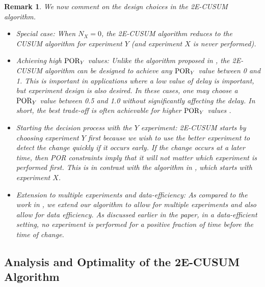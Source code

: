 \documentclass[journal, onecolumn]{IEEEtran}
\newtheorem{remark}{Remark}
\begin{document}
\begin{remark}
We now comment on the design choices in the \textup{2E-CUSUM} algorithm. 

\begin{itemize}
\item \textup{Special case}: When $N_X = 0$, the \textup{2E-CUSUM} algorithm reduces to the \textup{CUSUM} algorithm for experiment $Y$ (and experiment $X$ is never performed).

\item \textup{Achieving high $\textup{POR}_Y$ values}: Unlike the algorithm proposed in \cite{ren2017}, the \textup{2E-CUSUM} algorithm can be designed to achieve any $\textup{POR}_Y$ value between 0 and 1. This is important in applications where a low value of delay is important, but experiment design is also desired. In these cases, one may choose a $\textup{POR}_Y$ value between 0.5 and 1.0 without significantly affecting the delay. In short, the best trade-off is often achievable for higher $\textup{POR}_Y$ values \cite{banerjee2013}.

\item \textup{Starting the decision process with the $Y$ experiment}: \textup{2E-CUSUM} starts by choosing experiment $Y$ first because we wish to use the better experiment to detect the change quickly if it occurs early. If the change occurs at a later time, then POR constraints imply that it will not matter which experiment is performed first. This is in contrast with the algorithm in \cite{ren2017}, which starts with experiment $X$.

\item \textup{Extension to multiple experiments and data-efficiency}: As compared to the work in \cite{ren2017}, we extend our algorithm to allow for multiple experiments and also allow for data efficiency. As discussed earlier in the paper, in a data-efficient setting, no experiment is performed for a positive fraction of time before the time of change. 
\end{itemize}
\end{remark}




\subsection{Analysis and Optimality of the \textup{2E-CUSUM} Algorithm}
\label{sec:2e-cusum-analysis}
\end{document}
